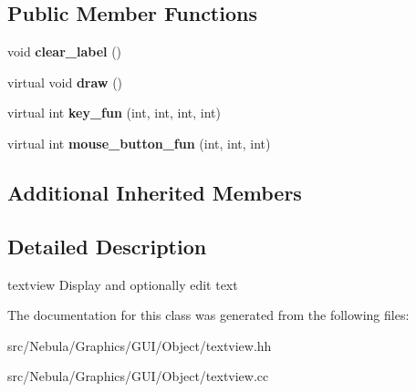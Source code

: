 \subsection*{Public Member Functions}
\begin{DoxyCompactItemize}
\item 
\hypertarget{classNeb_1_1gui_1_1object_1_1textview_a5d1069ed6e0b9922bca68c6b5deed78e}{void {\bfseries clear\-\_\-label} ()}\label{classNeb_1_1gui_1_1object_1_1textview_a5d1069ed6e0b9922bca68c6b5deed78e}

\item 
\hypertarget{classNeb_1_1gui_1_1object_1_1textview_a6dbfa06a5e62a0401ec61d91ea7b82ad}{virtual void {\bfseries draw} ()}\label{classNeb_1_1gui_1_1object_1_1textview_a6dbfa06a5e62a0401ec61d91ea7b82ad}

\item 
\hypertarget{classNeb_1_1gui_1_1object_1_1textview_ab93f2d1f2048fd8ac962c2507bdea381}{virtual int {\bfseries key\-\_\-fun} (int, int, int, int)}\label{classNeb_1_1gui_1_1object_1_1textview_ab93f2d1f2048fd8ac962c2507bdea381}

\item 
\hypertarget{classNeb_1_1gui_1_1object_1_1textview_aec400ee494b65de5b07026b6ab3e33c3}{virtual int {\bfseries mouse\-\_\-button\-\_\-fun} (int, int, int)}\label{classNeb_1_1gui_1_1object_1_1textview_aec400ee494b65de5b07026b6ab3e33c3}

\end{DoxyCompactItemize}
\subsection*{Additional Inherited Members}


\subsection{Detailed Description}
textview Display and optionally edit text 

The documentation for this class was generated from the following files\-:\begin{DoxyCompactItemize}
\item 
src/\-Nebula/\-Graphics/\-G\-U\-I/\-Object/textview.\-hh\item 
src/\-Nebula/\-Graphics/\-G\-U\-I/\-Object/textview.\-cc\end{DoxyCompactItemize}
